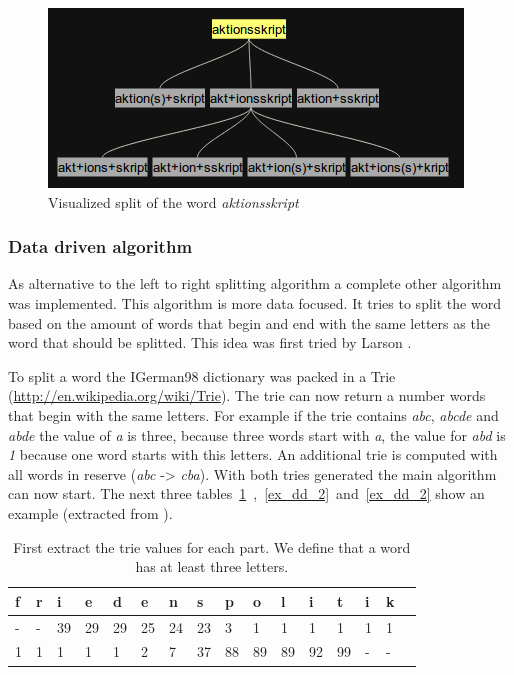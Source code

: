 \documentclass[11pt, accentcolor=tud9b, nochapname]{tudreport}
\begin{document}
\begin{figure}
  \begin{center}
    \includegraphics{images/tree.png}
  \end{center}
  \caption{Visualized split of the word \emph{aktionsskript}}
  \label{img_tree}
\end{figure}

\subsubsection{Data driven algorithm}

As alternative to the left to right splitting algorithm a complete other algorithm was implemented. This algorithm is more data focused. It tries to split the word based on the amount of words that begin and end with the same letters as the word that should be splitted. This idea was first tried by Larson \cite{dd}.

To split a word the IGerman98 dictionary was packed in a Trie (\url{http://en.wikipedia.org/wiki/Trie}). The trie can now return a number words that begin with the same letters. For example if the trie contains \emph{abc}, \emph{abcde} and \emph{abde} the value of \emph{a} is three, because three words start with \emph{a}, the value for \emph{abd} is \emph{1} because one word starts with this letters. An additional trie is computed with all words in reserve (\emph{abc} -> \emph{cba}). With both tries generated the main algorithm can now start. The next three tables~\ref{ex_dd_1}~,~\ref{ex_dd_2}~and~\ref{ex_dd_2} show an example (extracted from \cite{dd}).

\begin{table}[h]
\begin{center}
  \begin{tabular}{|l|l|l|l|l|l|l|l|l|l|l|l|l|l|l|l|}
    \hline
    f&r&i&e&d&e&n&s&p&o&l&i&t&i&k \\ \hline
    -&-&39&29&29&25&24&23&3&1&1&1&1&1&1 \\ \hline
    1&1&1&1&1&2&7&37&88&89&89&92&99&-&- \\ \hline
  \end{tabular}
  \caption{First extract the trie values for each part. We define that a word has at least three letters.}
  \label{ex_dd_1}
\end{center}
\end{table}
\end{document}
